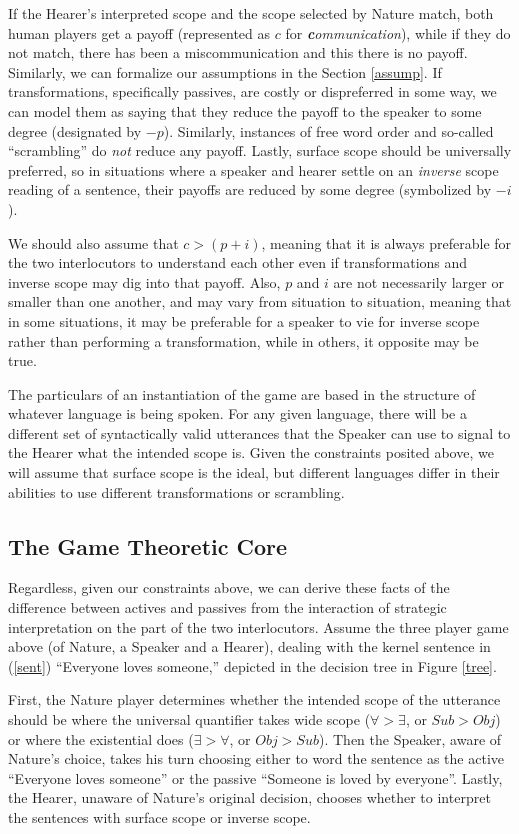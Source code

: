 \documentclass{article}
\begin{document}
If the Hearer's interpreted scope and the scope selected by Nature match, both human players get a payoff (represented as $c$ for \emph{\textbf{c}ommunication}), while if they do not match, there has been a miscommunication and this there is no payoff.
Similarly, we can formalize our assumptions in the Section \ref{assump}.
If transformations, specifically passives, are costly or dispreferred in some way, we can model them as saying that they reduce the payoff to the speaker to some degree (designated by $-p$).
Similarly, instances of free word order and so-called ``scrambling'' do \emph{not} reduce any payoff.
Lastly, surface scope should be universally preferred, so in situations where a speaker and hearer settle on an \emph{inverse} scope reading of a sentence, their payoffs are reduced by some degree (symbolized by $-i$).

We should also assume that $c > (p + i)$, meaning that it is always preferable for the two interlocutors to understand each other even if transformations and inverse scope may dig into that payoff.
Also, $p$ and $i$ are not necessarily larger or smaller than one another, and may vary from situation to situation, meaning that in some situations, it may be preferable for a speaker to vie for inverse scope rather than performing a transformation, while in others, it opposite may be true.

The particulars of an instantiation of the game are based in the structure of whatever language is being spoken.
For any given language, there will be a different set of syntactically valid utterances that the Speaker can use to signal to the Hearer what the intended scope is.
Given the constraints posited above, we will assume that surface scope is the ideal, but different languages differ in their abilities to use different transformations or scrambling.


\subsection{The Game Theoretic Core}

Regardless, given our constraints above, we can derive these facts of the difference between actives and passives from the interaction of strategic interpretation on the part of the two interlocutors.
Assume the three player game above (of Nature, a Speaker and a Hearer), dealing with the kernel sentence in (\ref{sent}) ``Everyone loves someone,'' depicted in the decision tree in Figure \ref{tree}.

First, the Nature player determines whether the intended scope of the utterance should be where the universal quantifier takes wide scope ($\forall>\exists$, or $Sub > Obj$) or where the existential does ($\exists>\forall$, or $Obj > Sub$).
Then the Speaker, aware of Nature's choice, takes his turn choosing either to word the sentence as the active ``Everyone loves someone'' or the passive ``Someone is loved by everyone''.
Lastly, the Hearer, unaware of Nature's original decision, chooses whether to interpret the sentences with surface scope or inverse scope.
\end{document}

